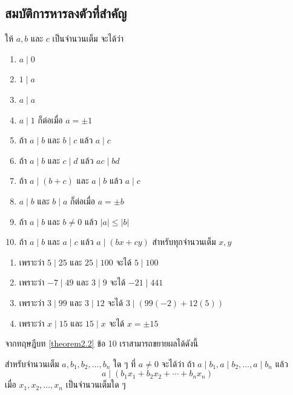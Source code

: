 \newpage
\subsection{สมบัติการหารลงตัวที่สำคัญ}
\begin{theorembox} \label{theorem2.2}
	ให้ $a, b$ และ $c$ เป็นจำนวนเต็ม จะได้ว่า
	\begin{enumerate}
		\item $a \mid 0$
		\item $1\mid a$
		\item $a \mid a$
		\item $a \mid 1$ ก็ต่อเมื่อ $a= \pm 1$
		\item ถ้า $a \mid b$ และ $b \mid c$ แล้ว $a \mid c$
		\item ถ้า $a \mid b$ และ $c \mid d$ แล้ว $a c \mid b d$
		\item ถ้า $a \mid(b+c)$ และ $a \mid b$ แล้ว $a \mid c$
		\item $a \mid b$ และ $b \mid a$ ก็ต่อเมื่อ $a= \pm b$
		\item ถ้า $a \mid b$ และ $b \neq 0$ แล้ว $|a| \leq|b|$
		\item ถ้า $a \mid b$ และ $a \mid c$ แล้ว $a \mid(b x+c y)$ สำหรับทุกจำนวนเต็ม $x, y$
	\end{enumerate}
\end{theorembox}

\begin{examplebox}
	\begin{enumerate}
		\item เพราะว่า $5 \mid 25$ และ $25 \mid 100$ จะได้ $5 \mid 100$
		\item เพราะว่า $-7 \mid 49$ และ $3 \mid 9$ จะได้ $-21 \mid 441$
		\item เพราะว่า $3 \mid 99$ และ $3 \mid 12$ จะได้ $3 \mid (99(-2) + 12(5))$
		\item เพราะว่า $x \mid 15$ และ $15 \mid x$ จะได้ $x = \pm 15$
	\end{enumerate}
\end{examplebox}

 จากทฤษฎีบท \ref{theorem2.2} ข้อ 10 เราสามารถขยายผลได้ดังนี้
 
\begin{corollarybox}
	สำหรับจำนวนเต็ม $a, b_1, b_2, \ldots, b_n$ ใด ๆ ที่ $a \neq 0$ จะได้ว่า 
	ถ้า $a \mid b_1, a \mid b_2, \ldots, a \mid b_n$ แล้ว 
	\[ a \mid (b_1 x_1 + b_2 x_2 + \cdots + b_n x_n) \]
	เมื่อ $x_1, x_2, \ldots, x_n$ เป็นจำนวนเต็มใด ๆ
\end{corollarybox}

